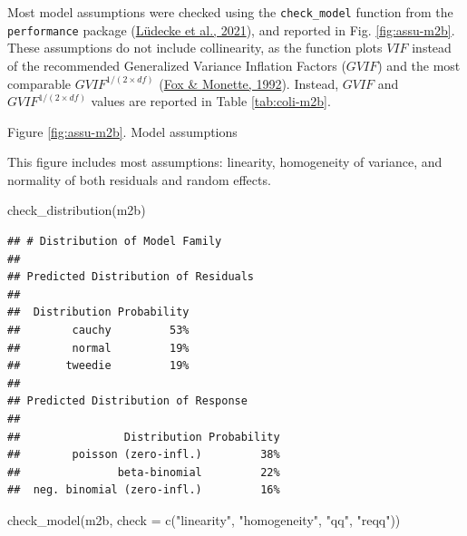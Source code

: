 \documentclass[
  bookmarksnumbered]{article}
\newenvironment{Shaded}{\begin{snugshade}}{\end{snugshade}}
\newcommand{\AttributeTok}[1]{\textcolor[rgb]{0.80,0.80,0.80}{#1}}
\newcommand{\FunctionTok}[1]{\textcolor[rgb]{0.94,0.94,0.56}{#1}}
\newcommand{\NormalTok}[1]{\textcolor[rgb]{0.80,0.80,0.80}{#1}}
\newcommand{\StringTok}[1]{\textcolor[rgb]{0.80,0.58,0.58}{#1}}
\begin{document}
Most model assumptions were checked using the \texttt{check\_model} function from the \texttt{performance} package (\protect\hyperlink{ref-ludecke2021}{Lüdecke et al., 2021}), and reported in Fig. \ref{fig:assu-m2b}. These assumptions do not include collinearity, as the function plots \(VIF\) instead of the recommended Generalized Variance Inflation Factors (\(GVIF\)) and the most comparable \(GVIF^{{1}/{(2 \times df)}}\) (\protect\hyperlink{ref-fox1992}{Fox \& Monette, 1992}). Instead, \(GVIF\) and \(GVIF^{{1}/{(2 \times df)}}\) values are reported in Table \ref{tab:coli-m2b}.

Figure \ref{fig:assu-m2b}. Model assumptions

This figure includes most assumptions: linearity, homogeneity of variance, and normality of both residuals and random effects.

\begin{Shaded}
\begin{Highlighting}[]
\FunctionTok{check\_distribution}\NormalTok{(m2b)}
\end{Highlighting}
\end{Shaded}

\begin{verbatim}
## # Distribution of Model Family
## 
## Predicted Distribution of Residuals
## 
##  Distribution Probability
##        cauchy         53%
##        normal         19%
##       tweedie         19%
## 
## Predicted Distribution of Response
## 
##                Distribution Probability
##        poisson (zero-infl.)         38%
##               beta-binomial         22%
##  neg. binomial (zero-infl.)         16%
\end{verbatim}

\begin{Shaded}
\begin{Highlighting}[]
\FunctionTok{check\_model}\NormalTok{(m2b,}
            \AttributeTok{check =} \FunctionTok{c}\NormalTok{(}\StringTok{"linearity"}\NormalTok{, }\StringTok{"homogeneity"}\NormalTok{, }\StringTok{"qq"}\NormalTok{, }\StringTok{"reqq"}\NormalTok{))}
\end{Highlighting}
\end{Shaded}
\end{document}
